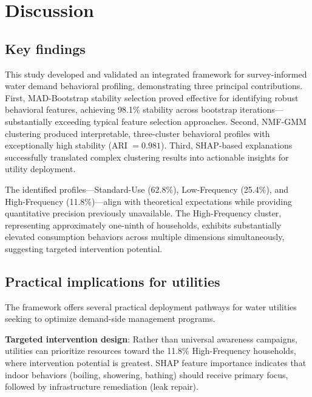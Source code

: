 \documentclass[a4paper,12pt]{article}
\begin{document}
\section{Discussion}

\subsection{Key findings}

This study developed and validated an integrated framework for survey-informed water demand behavioral profiling, demonstrating three principal contributions. First, MAD-Bootstrap stability selection proved effective for identifying robust behavioral features, achieving 98.1\% stability across bootstrap iterations---substantially exceeding typical feature selection approaches. Second, NMF-GMM clustering produced interpretable, three-cluster behavioral profiles with exceptionally high stability (ARI $= 0.981$). Third, SHAP-based explanations successfully translated complex clustering results into actionable insights for utility deployment.

The identified profiles---Standard-Use (62.8\%), Low-Frequency (25.4\%), and High-Frequency (11.8\%)---align with theoretical expectations while providing quantitative precision previously unavailable. The High-Frequency cluster, representing approximately one-ninth of households, exhibits substantially elevated consumption behaviors across multiple dimensions simultaneously, suggesting targeted intervention potential.

\subsection{Practical implications for utilities}

The framework offers several practical deployment pathways for water utilities seeking to optimize demand-side management programs.

\textbf{Targeted intervention design}: Rather than universal awareness campaigns, utilities can prioritize resources toward the 11.8\% High-Frequency households, where intervention potential is greatest. SHAP feature importance indicates that indoor behaviors (boiling, showering, bathing) should receive primary focus, followed by infrastructure remediation (leak repair).
\end{document}
